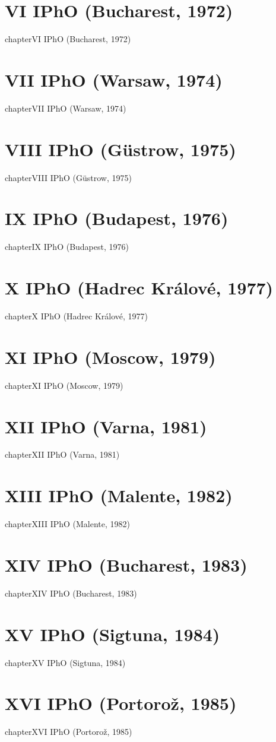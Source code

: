 \documentclass[12pt,a4paper]{book}
\begin{document}
\chapter*{VI IPhO (Bucharest, 1972)}
{chapter}{VI IPhO (Bucharest, 1972)}
\chapter*{VII IPhO (Warsaw, 1974)}
{chapter}{VII IPhO (Warsaw, 1974)}
\chapter*{VIII IPhO (G\"ustrow, 1975)}
{chapter}{VIII IPhO (G\"ustrow, 1975)}
\chapter*{IX IPhO (Budapest, 1976)}
{chapter}{IX IPhO (Budapest, 1976)}
\chapter*{X IPhO (Hadrec Kr\'alov\'e, 1977)}
{chapter}{X IPhO (Hadrec Kr\'alov\'e, 1977)}
\chapter*{XI IPhO (Moscow, 1979)}
{chapter}{XI IPhO (Moscow, 1979)}
\chapter*{XII IPhO (Varna, 1981)}
{chapter}{XII IPhO (Varna, 1981)}
\chapter*{XIII IPhO (Malente, 1982)}
{chapter}{XIII IPhO (Malente, 1982)}
\chapter*{XIV IPhO (Bucharest, 1983)}
{chapter}{XIV IPhO (Bucharest, 1983)}
\chapter*{XV IPhO (Sigtuna, 1984)}
{chapter}{XV IPhO (Sigtuna, 1984)}
\chapter*{XVI IPhO (Portoro\v{z}, 1985)}
{chapter}{XVI IPhO (Portoro\v{z}, 1985)}
\end{document}
